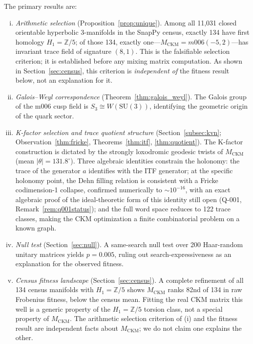 \documentclass[11pt,a4paper]{article}
\theoremstyle{remark}
\newcommand{\MCKM}{M_{\mathrm{CKM}}}
\newcommand{\Zfive}{\mathbb{Z}/5}
\begin{document}
The primary results are:
\begin{enumerate}[(i)]
\item \emph{Arithmetic selection} (Proposition~\ref{prop:unique}).
  Among all 11,031 closed orientable hyperbolic 3-manifolds in the
  SnapPy census, exactly 134 have first homology $H_1 = \Zfive$;
  of those 134, exactly one---$\MCKM = m006(-5,2)$---has invariant
  trace field of signature $(8,1)$.
  This is the falsifiable selection criterion; it is established
  before any mixing matrix computation.
  As shown in Section~\ref{sec:census}, this criterion is
  \emph{independent of} the fitness result below, not an explanation
  for it.

\item \emph{Galois--Weyl correspondence} (Theorem~\ref{thm:galois_weyl}).
  The Galois group of the m006 cusp field is $S_3 \cong W(\mathrm{SU}(3))$,
  identifying the geometric origin of the quark sector.

\item \emph{K-factor selection and trace quotient structure}
  (Section~\ref{subsec:kvn}; Observation~\ref{thm:fricke},
  Theorems~\ref{thm:itf}, \ref{thm:quotient}).
  The K-factor construction is dictated by the strongly loxodromic
  geodesic twists of $\MCKM$ (mean $|\theta| = 131.8^\circ$).
  Three algebraic identities constrain the holonomy: the trace of the
  generator $a$ identifies with the ITF generator; at the specific
  holonomy point, the Dehn filling relation is consistent with a Fricke
  codimension-1 collapse, confirmed numerically to $\sim 10^{-16}$, with
  an exact algebraic proof of the ideal-theoretic form of this identity
  still open (Q-001, Remark~\ref{rem:q001status}); and the full word
  space reduces to 122 trace classes, making the CKM optimization a
  finite combinatorial problem on a known graph.

\item \emph{Null test} (Section~\ref{sec:null}).
  A same-search null test over 200 Haar-random unitary matrices yields
  $p = 0.005$, ruling out search-expressiveness as an explanation
  for the observed fitness.

\item \emph{Census fitness landscape} (Section~\ref{sec:census}).
  A complete refinement of all 134 census manifolds with $H_1 = \Zfive$
  shows $\MCKM$ ranks 82nd of 134 in raw Frobenius fitness, below the
  census mean. Fitting the real CKM matrix this well is a generic
  property of the $H_1 = \Zfive$ torsion class, not a special property
  of $\MCKM$. The arithmetic selection criterion of (i) and the fitness
  result are independent facts about $\MCKM$; we do not claim one
  explains the other.
\end{enumerate}
\end{document}
